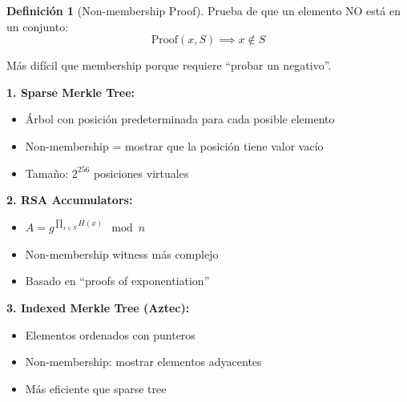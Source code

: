 \documentclass[11pt,a4paper,twoside]{book}
\theoremstyle{definition}
\newtheorem{definition}{Definición}[chapter]
\theoremstyle{remark}
\begin{document}
\begin{definition}[Non-membership Proof]
Prueba de que un elemento NO está en un conjunto:
\[
\text{Proof}(x, S) \implies x \notin S
\]

Más difícil que membership porque requiere ``probar un negativo''.
\end{definition}

\begin{mathnote}
\textbf{1. Sparse Merkle Tree:}
\begin{itemize}
    \item Árbol con posición predeterminada para cada posible elemento
    \item Non-membership = mostrar que la posición tiene valor vacío
    \item Tamaño: $2^{256}$ posiciones virtuales
\end{itemize}

\textbf{2. RSA Accumulators:}
\begin{itemize}
    \item $A = g^{\prod_{x \in S} H(x)} \mod n$
    \item Non-membership witness más complejo
    \item Basado en ``proofs of exponentiation''
\end{itemize}

\textbf{3. Indexed Merkle Tree (Aztec):}
\begin{itemize}
    \item Elementos ordenados con punteros
    \item Non-membership: mostrar elementos adyacentes
    \item Más eficiente que sparse tree
\end{itemize}
\end{mathnote}
\end{document}
